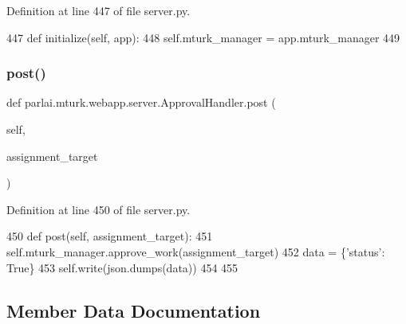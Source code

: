 Definition at line 447 of file server.\+py.


\begin{DoxyCode}
447     \textcolor{keyword}{def }initialize(self, app):
448         self.mturk\_manager = app.mturk\_manager
449 
\end{DoxyCode}
\mbox{\label{classparlai_1_1mturk_1_1webapp_1_1server_1_1ApprovalHandler_a94b2c2a69732dde8ea1e92a8b4f5f7ea}} 
\subsubsection{\texorpdfstring{post()}{post()}}
{\footnotesize\ttfamily def parlai.\+mturk.\+webapp.\+server.\+Approval\+Handler.\+post (\begin{DoxyParamCaption}\item[{}]{self,  }\item[{}]{assignment\+\_\+target }\end{DoxyParamCaption})}



Definition at line 450 of file server.\+py.


\begin{DoxyCode}
450     \textcolor{keyword}{def }post(self, assignment\_target):
451         self.mturk\_manager.approve\_work(assignment\_target)
452         data = \{\textcolor{stringliteral}{'status'}: \textcolor{keyword}{True}\}
453         self.write(json.dumps(data))
454 
455 
\end{DoxyCode}


\subsection{Member Data Documentation}
\mbox{\label{classparlai_1_1mturk_1_1webapp_1_1server_1_1ApprovalHandler_ac6cbcc9f89912ecbd3b9c677e44225b1}} 
